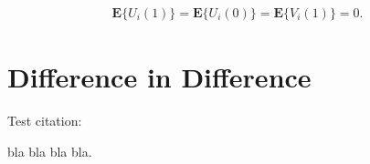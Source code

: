 \begin{align}
	\label{eq:eq10}
	\boldsymbol{E}\{\textit{U}_i(1)\} = \boldsymbol{E}\{\textit{U}_i(0)\} = \boldsymbol{E}\{\textit{V}_i(1)\} = 0.
\end{align}



\section{Difference in Difference} \label{sec:difference}

Test citation:

bla bla \cite{Foroni2011} bla bla. \\


\clearpage





\clearpage


